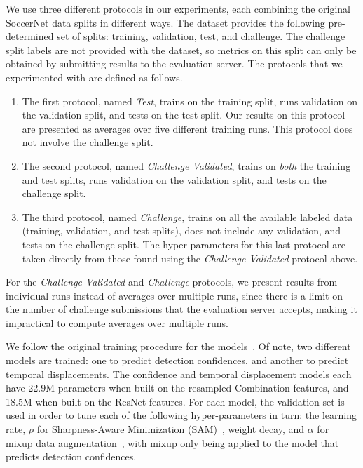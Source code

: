 \documentclass[10pt,twocolumn,letterpaper]{article}
\begin{document}
We use three different protocols in our experiments, each combining the original SoccerNet data splits in different ways. The dataset provides the following pre-determined set of splits: training, validation, test, and challenge. The challenge split labels are not provided with the dataset, so metrics on this split can only be obtained by submitting results to the evaluation server. The protocols that we experimented with are defined as follows. \begin{enumerate}
    \item The first protocol, named {\it Test}, trains on the training split, runs validation on the validation split, and tests on the test split. Our results on this protocol are presented as averages over five different training runs. This protocol does not involve the challenge split.
    \item The second protocol, named {\it Challenge Validated}, trains on {\it both} the training and test splits, runs validation on the validation split, and tests on the challenge split.
    \item The third protocol, named {\it Challenge}, trains on all the available labeled data (training, validation, and test splits), does not include any validation, and tests on the challenge split. The hyper-parameters for this last protocol are taken directly from those found using the {\it Challenge Validated} protocol above.
\end{enumerate}
For the {\it Challenge Validated} and {\it Challenge} protocols, we present results from individual runs instead of averages over multiple runs, since there is a limit on the number of challenge submissions that the evaluation server accepts, making it impractical to compute averages over multiple runs.

We follow the original training procedure for the models~\cite{soares2022temporally}. Of note, two different models are trained: one to predict detection confidences, and another to predict temporal displacements. 
The confidence and temporal displacement models each have 22.9M parameters when built on the resampled Combination features, and 18.5M when built on the ResNet features. For each model, the validation set is used in order to tune each of the following hyper-parameters in turn: the learning rate, $\rho$ for Sharpness-Aware Minimization (SAM)~\cite{foret2021sharpnessaware}, weight decay, and $\alpha$ for mixup data augmentation~\cite{zhang2018mixup}, with mixup only being applied to the model that predicts detection confidences.
\end{document}
